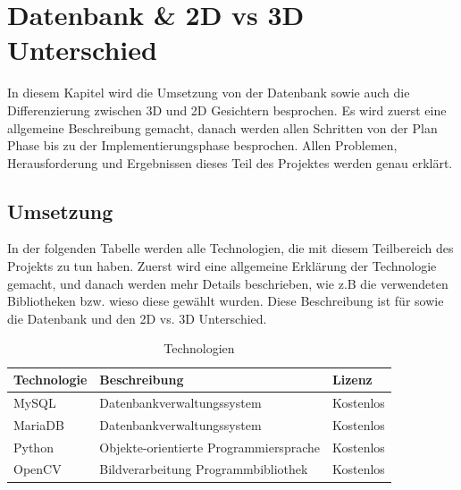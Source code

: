 \chapter{Datenbank \& 2D vs 3D Unterschied}
\label{\docname}
In diesem Kapitel wird die Umsetzung von der Datenbank sowie auch die Differenzierung zwischen 3D und 2D Gesichtern besprochen. Es wird zuerst eine allgemeine Beschreibung gemacht, danach werden allen Schritten von der Plan Phase bis zu der Implementierungsphase besprochen. Allen Problemen, Herausforderung und Ergebnissen dieses Teil des Projektes werden genau erklärt.
\section{Umsetzung}
In der folgenden Tabelle werden alle Technologien, die mit diesem Teilbereich des Projekts  zu tun haben. Zuerst wird eine allgemeine Erklärung der Technologie gemacht, und danach werden mehr Details beschrieben, wie z.B die verwendeten Bibliotheken bzw. wieso diese gewählt wurden. Diese Beschreibung ist für sowie die Datenbank und den 2D vs. 3D Unterschied.

\begin{table}[ht]
	\centering
	\begin{tabular}{ |l|l|l| } 
		\hline		
		Technologie & Beschreibung & Lizenz \\ 
		\hline
		MySQL & Datenbankverwaltungssystem & Kostenlos \\ 
		\hline
		MariaDB & Datenbankverwaltungssystem & Kostenlos \\
		\hline 
		Python & Objekte-orientierte Programmiersprache & Kostenlos \\
		\hline 
		OpenCV &  Bildverarbeitung Programmbibliothek  & Kostenlos \\ 
		\hline
	\end{tabular}
	\caption{Technologien}
	\label{table:tech}
\end{table}
